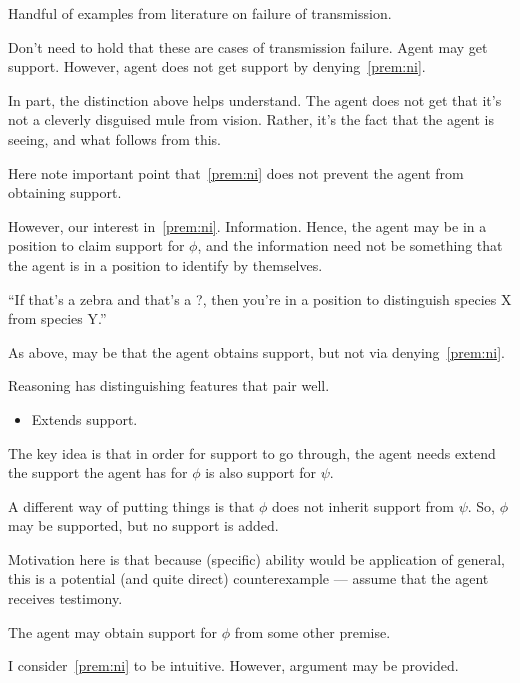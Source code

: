 \begin{note}
  Handful of examples from literature on failure of transmission.

  Don't need to hold that these are cases of transmission failure.
  Agent may get support.
  However, agent does not get support by denying~\ref{prem:ni}.

  In part, the distinction above helps understand.
  The agent does not get that it's not a cleverly disguised mule from vision.
  Rather, it's the fact that the agent is seeing, and what follows from this.

  {
    \color{red}
    Here note important point that~\ref{prem:ni} does not prevent the agent from obtaining support.
  }

  However, our interest in~\ref{prem:ni}.
  Information.
  Hence, the agent may be in a position to claim support for \(\phi\), and the information need not be something that the agent is in a position to identify by themselves.

  ``If that's a zebra and that's a ?, then you're in a position to distinguish species X from species Y.''

  As above, may be that the agent obtains support, but not via denying~\ref{prem:ni}.
\end{note}

\begin{note}
  Reasoning has distinguishing features that pair well.
  \begin{itemize}
  \item Extends support.
  \end{itemize}
\end{note}

\begin{note}
  The key idea is that in order for support to go through, the agent needs extend the support the agent has for \(\phi\) is also support for \(\psi\).

  {
    \color{red}
    A different way of putting things is that \(\phi\) does not inherit support from \(\psi\).
    So, \(\phi\) may be supported, but no support is added.
  }


  {
    \color{green}
    Motivation here is that because (specific) ability would be application of general, this is a potential (and quite direct) counterexample --- assume that the agent receives testimony.
  }


  {
    \color{red}
    The agent may obtain support for \(\phi\) from some other premise.
  }

  I consider~\ref{prem:ni} to be intuitive.
  However, argument may be provided.
\end{note}

